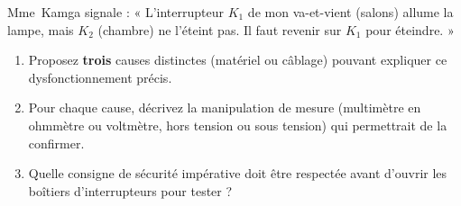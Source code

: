 \documentclass[11pt]{article}
\begin{document}
\begin{exercice}
Mme~Kamga signale : « L'interrupteur $K_1$ de mon va-et-vient (salons) allume la lampe, mais $K_2$ (chambre) ne l'éteint pas. Il faut revenir sur $K_1$ pour éteindre. »
\begin{enumerate}
    \item Proposez \textbf{trois} causes distinctes (matériel ou câblage) pouvant expliquer ce dysfonctionnement précis.
    \item Pour chaque cause, décrivez la manipulation de mesure (multimètre en ohmmètre ou voltmètre, hors tension ou sous tension) qui permettrait de la confirmer.
    \item Quelle consigne de sécurité impérative doit être respectée avant d'ouvrir les boîtiers d'interrupteurs pour tester ?
\end{enumerate}
\end{exercice}
\end{document}
